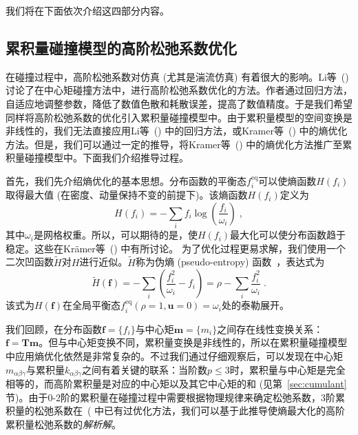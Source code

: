 我们将在下面依次介绍这四部分内容。

\subsection{累积量碰撞模型的高阶松弛系数优化}
在碰撞过程中，高阶松弛系数对仿真 (尤其是湍流仿真) 有着很大的影响。Li等~(\citeyear{Li-2020}) 讨论了在中心矩碰撞方法中，进行高阶松弛系数优化的方法。作者通过回归方法，自适应地调整参数，降低了数值色散和耗散误差，提高了数值精度。于是我们希望同样将高阶松弛系数的优化引入累积量碰撞模型中。由于累积量模型的空间变换是非线性的，我们无法直接应用Li等~(\citeyear{Li-2020}) 中的回归方法，或Kramer等~(\citeyear{Kramer-2019}) 中的熵优化方法。但是，我们可以通过一定的推导，将Kramer等~(\citeyear{Kramer-2019}) 中的熵优化方法推广至累积量碰撞模型中。下面我们介绍推导过程。

首先，我们先介绍熵优化的基本思想。分布函数的平衡态$f^\text{eq}_i$可以使熵函数$H(f_i)$取得最大值 (在密度、动量保持不变的前提下)。该熵函数$H(f_i)$定义为
\begin{equation}
\label{eq:entropy_func}
H(f_i)=-\sum_i f_i \log \left(\frac{f_i}{\omega_i}\right) \;,
\end{equation}
其中$\omega_i$是网格权重。所以，可以期待的是，使$H(f_i)$最大化可以使分布函数趋于稳定。这些在Kr{\"a}mer等~(\citeyear{Kramer-2019}) 中有所讨论。
为了优化过程更易求解，我们使用一个二次凹函数$\tilde{H}$对$H$进行近似。$\tilde{H}$称为伪熵 (pseudo-entropy) 函数~\cite{Kramer-2019}，表达式为
\begin{equation}
\label{eq:pseudoentropy_func}
\tilde{H}(\bm{f})=-\sum_{i}\left(\frac{f_i^2}{\omega_i}-f_i\right)=\rho-\sum_{i} \frac{f_i^2}{\omega_i}\;.
\end{equation}
该式为$H(\bm{f})$在全局平衡态$f_i^{\mathrm{eq}}(\rho=1, \mathbf{u}=0)=\omega_i$处的泰勒展开。

我们回顾，在分布函数$\bm{f}\!=\!\{f_i\}$与中心矩$\bm{m}\!=\!\{m_i\}$之间存在线性变换关系：$\bm{f}\!=\!\bm{T}\bm{m}$。但与中心矩变换不同，累积量变换是非线性的，所以在累积量碰撞模型中应用熵优化依然是非常复杂的。不过我们通过仔细观察后，可以发现在中心矩$m_{\alpha\beta\gamma}$与累积量$k_{\alpha\beta\gamma}$之间有着关键的联系：当阶数$p\!\leq\!3$时，累积量与中心矩是完全相等的，而高阶累积量是对应的中心矩以及其它中心矩的和 (见第~\ref{sec:cumulant} 节)。由于0-2阶的累积量在碰撞过程中需要根据物理规律来确定松弛系数，3阶累积量的松弛系数在~(\cite{Geier-2017} 中已有过优化方法，我们可以基于此推导使熵最大化的高阶累积量松弛系数的\emph{解析解}。

